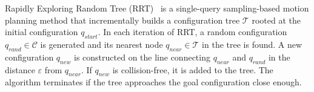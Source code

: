 \documentclass[usletter, 10pt, conference]{ieeeconf} %
\def\qrand{q_{rand}}
\def\qstart{q_{start}}
\def\qinit{\qstart}
\def\qnear{q_{near}}
\def\qnew{q_{new}}
\def\T{\mathcal{T}}
\def\C{\mathcal{C}}
\begin{document}

Rapidly Exploring Random Tree (RRT)~\cite{lavalleRRT} is a single-query sampling-based motion planning method that 
incrementally builds a configuration tree $\T$ rooted at the initial configuration $\qinit$.
In each iteration of RRT, a random configuration $\qrand \in \C$ is generated and its nearest node $\qnear \in \T$ in the tree is found.
A new configuration $\qnew$ is constructed on the line connecting $\qnear$ and $\qrand$ in the distance $\varepsilon$ from $\qnear$.
If $\qnew$ is collision-free, it is added to the tree.
The algorithm terminates if the tree approaches the goal configuration close enough.

\end{document}
